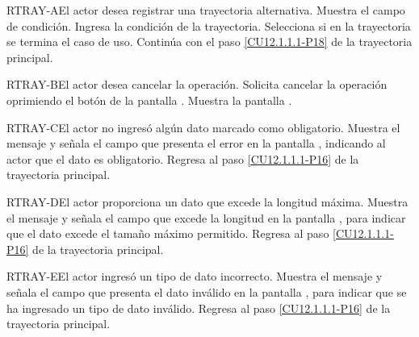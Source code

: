 	
	\begin{UCtrayectoriaA}{RTRAY-A}{El actor desea registrar una trayectoria alternativa.}
		\UCpaso[\UCsist] Muestra el campo de condición.
		\UCpaso[\UCactor] Ingresa la condición de la trayectoria.
		\UCpaso[\UCactor] Selecciona si en la trayectoria se termina el caso de uso.
		\UCpaso Continúa con el paso \ref{CU12.1.1.1-P18} de la trayectoria principal.
	\end{UCtrayectoriaA}

	\begin{UCtrayectoriaA}{RTRAY-B}{El actor desea cancelar la operación.}
		\UCpaso[\UCactor] Solicita cancelar la operación oprimiendo el botón  de la pantalla .
		\UCpaso[\UCsist] Muestra la pantalla .
	\end{UCtrayectoriaA}

	\begin{UCtrayectoriaA}{RTRAY-C}{El actor no ingresó algún dato marcado como obligatorio.}
		\UCpaso[\UCsist] Muestra el mensaje  y señala el campo que presenta el error en la pantalla , indicando al actor que el dato es obligatorio.
		\UCpaso Regresa al paso \ref{CU12.1.1.1-P16} de la trayectoria principal.
	\end{UCtrayectoriaA}

	\begin{UCtrayectoriaA}{RTRAY-D}{El actor proporciona un dato que excede la longitud máxima.}
		\UCpaso[\UCsist] Muestra el mensaje  y señala el campo que excede la longitud en la pantalla , para indicar que el dato excede el tamaño máximo permitido.
		\UCpaso Regresa al paso \ref{CU12.1.1.1-P16} de la trayectoria principal.
	\end{UCtrayectoriaA}

	\begin{UCtrayectoriaA}{RTRAY-E}{El actor ingresó un tipo de dato incorrecto.}
		\UCpaso[\UCsist] Muestra el mensaje  y señala el campo que presenta el dato inválido en la pantalla , para indicar que se ha ingresado un tipo de dato inválido.
		\UCpaso Regresa al paso \ref{CU12.1.1.1-P16} de la trayectoria principal.
	\end{UCtrayectoriaA}
	

